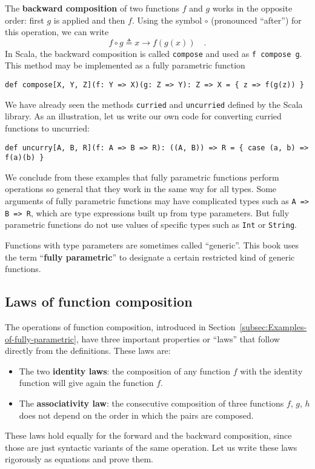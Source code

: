The \textbf{backward composition} of
two functions $f$ and $g$ works in the opposite order: first $g$
is applied and then $f$. Using the symbol $\circ$ (pronounced \textsf{``}after\textsf{''})
for this operation, we can write
\begin{equation}
f\circ g\triangleq x\rightarrow f(g(x))\quad.\label{eq:def-of-backward-composition}
\end{equation}
In Scala, the backward composition is called \lstinline!compose!
and used as \lstinline!f compose g!. This method may be implemented
as a fully parametric function
\begin{lstlisting}
def compose[X, Y, Z](f: Y => X)(g: Z => Y): Z => X = { z => f(g(z)) }
\end{lstlisting}

We have already seen the methods \lstinline!curried! and \lstinline!uncurried!
defined by the Scala library. As an illustration, let us write our
own code for converting curried functions to uncurried:
\begin{lstlisting}
def uncurry[A, B, R](f: A => B => R): ((A, B)) => R = { case (a, b) => f(a)(b) }
\end{lstlisting}

We conclude from these examples that fully parametric functions perform
operations so general that they work in the same way for all types.
Some arguments of fully parametric functions may have complicated
types such as \lstinline!A => B => R!, which are type expressions
built up from type parameters. But fully parametric functions do not
use values of specific types such as \lstinline!Int! or \lstinline!String!.

Functions with type parameters are sometimes called \textsf{``}generic\textsf{''}.
This book uses the term \textsf{``}\textbf{fully
parametric}\textsf{''} to designate a certain restricted kind of generic functions.

\subsection{Laws of function composition\label{subsec:Laws-of-function-composition}}

The operations of function composition, introduced in Section~\ref{subsec:Examples-of-fully-parametric},
have three important properties or \textsf{``}laws\textsf{''} that follow directly
from the definitions. These laws are:
\begin{itemize}
\item The two \textbf{identity laws}:
the composition of any function $f$ with the identity function will
give again the function $f$.
\item The \textbf{associativity law}:
the consecutive composition of three functions $f$, $g$, $h$ does
not depend on the order in which the pairs are composed.
\end{itemize}
These laws hold equally for the forward and the backward composition,
since those are just syntactic variants of the same operation. Let
us write these laws rigorously as equations and prove them.

